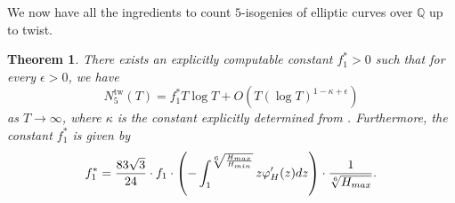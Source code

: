 \documentclass[12pt]{amsart}
\newcounter{counter}[section] %
\numberwithin{equation}{section} %
\newtheorem{theorem}[counter]{Theorem}
\theoremstyle{definition} \newtheorem{definition}[counter]{Definition}
\theoremstyle{remark} \newtheorem{nonexam}[counter]{Non-example}
\let\originalleft\left \let\originalright\right
\renewcommand{\left}{\mathopen{}\mathclose\bgroup\originalleft}
\renewcommand{\right}{\aftergroup\egroup\originalright}
\DeclareMathOperator{\tw}{tw} %
\begin{document}
We now have all the ingredients to count $5$-isogenies of elliptic curves over $\mathbb{Q}$ up to twist.

\begin{theorem} \label{thm:FF-count-twist}
    There exists an explicitly computable constant $f_{1}^* > 0$ such that for every $\epsilon > 0$, we have
    \begin{equation*}
        N_5^{\tw}(T) = f_1^* T \log T + O(T(\log T)^{1-\kappa + \epsilon})
    \end{equation*}
    as $T \to \infty$, where $\kappa$ is the constant explicitly determined from . Furthermore, the constant $f_1^*$ is given by
    \begin{equation*}
        f_1^* = \frac{83\sqrt{3}}{24} \cdot f_1 \cdot \left(- \int_1^{\sqrt[6]{\frac{H_{max}}{H_{min}}}} z \varphi'_H(z) dz \right) \cdot \frac{1}{\sqrt[6]{H_{max}}}.
    \end{equation*}
\end{theorem}
\end{document}
